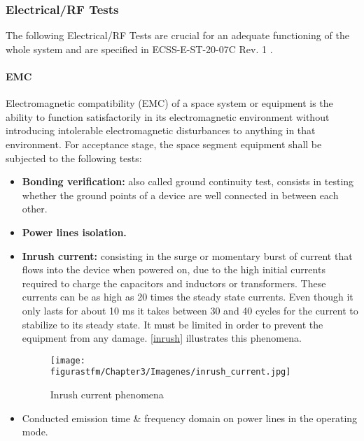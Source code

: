 \newpage
\subsubsection{Electrical/RF Tests}

The following Electrical/RF Tests are crucial for an adequate functioning of the whole system and are specified in ECSS-E-ST-20-07C Rev. 1 \cite{ESAmagnetic}.


\paragraph{EMC}

Electromagnetic compatibility (\acrshort{EMC}) of a space system or equipment is the ability to function satisfactorily in its electromagnetic environment without introducing intolerable electromagnetic disturbances to anything in that environment. For acceptance stage, the space segment equipment shall be subjected to the
following tests:

\begin{itemize} [noitemsep,topsep=0pt]
	

	\item{\textbf{Bonding verification:} also called ground continuity test, consists in testing whether the ground points of a device are well connected in between each other.} \\
	\item{\textbf{Power lines isolation.}} \\
	\item \textbf{Inrush current:} consisting in the surge or momentary burst of current that flows into the device when powered on, due to the high initial currents required to charge the capacitors and inductors or transformers. These currents can be as high as 20 times the steady state currents. Even though it only lasts for about 10 ms it takes between 30 and 40 cycles for the current to stabilize to its steady state. It must be limited in order to prevent the equipment from any damage. \autoref{inrush} illustrates this phenomena. \\
	
	\begin{figure} [H] 				
				\centering
				\texttt{[image: figurastfm/Chapter3/Imagenes/inrush\_current.jpg]}
				\caption{Inrush current phenomena \cite{sunpower}} \label{inrush}
				\vspace{-0.3cm}
	\end{figure}	
	
	\item Conducted emission time \& frequency domain on power lines in the operating mode.
	
\end{itemize}
\vspace{-1cm}


